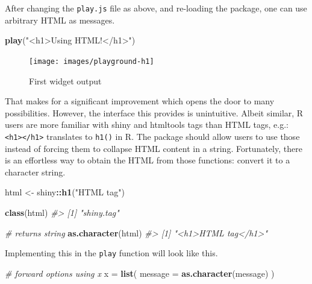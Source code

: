 \documentclass[10pt,]{krantz}
\makeatletter
\newenvironment{Shaded}{\begin{snugshade}}{\end{snugshade}}
\newcommand{\CommentTok}[1]{\textcolor[rgb]{0.37,0.37,0.37}{\textit{#1}}}
\newcommand{\DataTypeTok}[1]{\textcolor[rgb]{0.27,0.27,0.27}{#1}}
\newcommand{\KeywordTok}[1]{\textcolor[rgb]{0.27,0.27,0.27}{\textbf{#1}}}
\newcommand{\NormalTok}[1]{#1}
\newcommand{\OperatorTok}[1]{\textcolor[rgb]{0.43,0.43,0.43}{\textbf{#1}}}
\newcommand{\StringTok}[1]{\textcolor[rgb]{0.5,0.5,0.5}{#1}}
\newenvironment{kframe}{%
\medskip{}
\setlength{\fboxsep}{.8em}
 \def\at@end@of@kframe{}%
 \ifinner\ifhmode%
  \def\at@end@of@kframe{\end{minipage}}%
  \begin{minipage}{\columnwidth}%
 \fi\fi%
 \def\FrameCommand##1{\hskip\@totalleftmargin \hskip-\fboxsep
 \colorbox{shadecolor}{##1}\hskip-\fboxsep
     \hskip-\linewidth \hskip-\@totalleftmargin \hskip\columnwidth}%
 \MakeFramed {\advance\hsize-\width
   \@totalleftmargin\z@ \linewidth\hsize
   \@setminipage}}%
 {\par\unskip\endMakeFramed%
 \at@end@of@kframe}
\renewenvironment{Shaded}{\begin{kframe}}{\end{kframe}}
\makeatother
\begin{document}
After changing the \texttt{play.js} file as above, and re-loading the package, one can use arbitrary HTML as messages.

\begin{Shaded}
\begin{Highlighting}[]
\KeywordTok{play}\NormalTok{(}\StringTok{"<h1>Using HTML!</h1>"}\NormalTok{)}
\end{Highlighting}
\end{Shaded}

\begin{figure}[H]

{\centering \texttt{[image: images/playground-h1]} 

}

\caption{First widget output}\label{fig:playground-h1}
\end{figure}

That makes for a significant improvement which opens the door to many possibilities. However, the interface this provides is unintuitive. Albeit similar, R users are more familiar with shiny and htmltools \citep{R-htmltools} tags than HTML tags, e.g.: \texttt{\textless{}h1\textgreater{}\textless{}/h1\textgreater{}} translates to \texttt{h1()} in R. The package should allow users to use those instead of forcing them to collapse HTML content in a string. Fortunately, there is an effortless way to obtain the HTML from those functions: convert it to a character string.

\begin{Shaded}
\begin{Highlighting}[]
\NormalTok{html <-}\StringTok{ }\NormalTok{shiny}\OperatorTok{::}\KeywordTok{h1}\NormalTok{(}\StringTok{"HTML tag"}\NormalTok{)}

\KeywordTok{class}\NormalTok{(html)}
\CommentTok{#> [1] "shiny.tag"}

\CommentTok{# returns string}
\KeywordTok{as.character}\NormalTok{(html)}
\CommentTok{#> [1] "<h1>HTML tag</h1>"}
\end{Highlighting}
\end{Shaded}

Implementing this in the \texttt{play} function will look like this.

\begin{Shaded}
\begin{Highlighting}[]
\CommentTok{# forward options using x}
\NormalTok{x =}\StringTok{ }\KeywordTok{list}\NormalTok{(}
  \DataTypeTok{message =} \KeywordTok{as.character}\NormalTok{(message)}
\NormalTok{)}
\end{Highlighting}
\end{Shaded}
\end{document}
